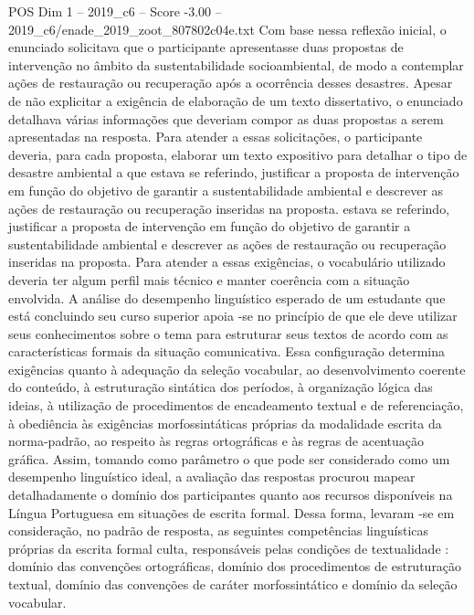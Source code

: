 \begin{textsample}{POS Dim 1 – 2019\_c6 – Score -3.00 – 2019\_c6/enade\_2019\_zoot\_807802c04e.txt}
Com base nessa reflexão inicial, o enunciado solicitava que o participante apresentasse duas propostas de intervenção no âmbito da sustentabilidade socioambiental, de modo a contemplar ações de restauração ou recuperação após a ocorrência desses desastres.
Apesar de não explicitar a exigência de elaboração de um texto dissertativo, o enunciado detalhava várias informações que deveriam compor as duas propostas a serem apresentadas na resposta.
Para atender a essas solicitações, o participante deveria, para cada proposta, elaborar um texto expositivo para detalhar o tipo de desastre ambiental a que estava se referindo, justificar a proposta de intervenção em função do objetivo de garantir a sustentabilidade ambiental e descrever as ações de restauração ou recuperação inseridas na proposta. estava se referindo, justificar a proposta de intervenção em função do objetivo de garantir a sustentabilidade ambiental e descrever as ações de restauração ou recuperação inseridas na proposta.
Para atender a essas exigências, o vocabulário utilizado deveria ter algum perfil mais técnico e manter coerência com a situação envolvida.
A análise do desempenho linguístico esperado de um estudante que está concluindo seu curso superior apoia -se no princípio de que ele deve utilizar seus conhecimentos sobre o tema para estruturar seus textos de acordo com as características formais da situação comunicativa.
Essa configuração determina exigências quanto à adequação da seleção vocabular, ao desenvolvimento coerente do conteúdo, à estruturação sintática dos períodos, à organização lógica das ideias, à utilização de procedimentos de encadeamento textual e de referenciação, à obediência às exigências morfossintáticas próprias da modalidade escrita da norma-padrão, ao respeito às regras ortográficas e às regras de acentuação gráfica.
Assim, tomando como parâmetro o que pode ser considerado como um desempenho linguístico ideal, a avaliação das respostas procurou mapear detalhadamente o domínio dos participantes quanto aos recursos disponíveis na Língua Portuguesa em situações de escrita formal.
Dessa forma, levaram -se em consideração, no padrão de resposta, as seguintes competências linguísticas próprias da escrita formal culta, responsáveis pelas condições de textualidade : domínio das convenções ortográficas, domínio dos procedimentos de estruturação textual, domínio das convenções de caráter morfossintático e domínio da seleção vocabular.

\end{textsample}
